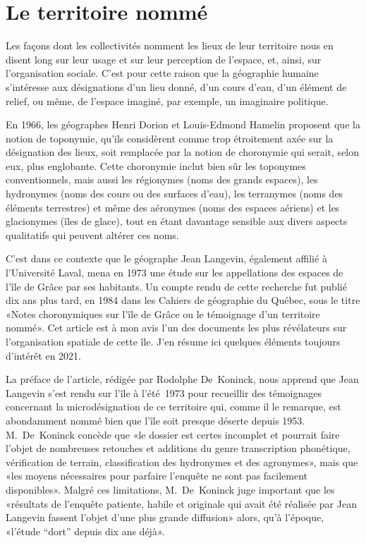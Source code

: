 \documentclass[12pt]{report}
\begin{document}
\section{Le territoire nommé}
Les façons dont les collectivités nomment les lieux de leur territoire nous en disent long sur leur usage et sur leur perception de l’espace, et, ainsi, sur l’organisation sociale. C’est pour cette raison que la géographie humaine s’intéresse aux désignations d’un lieu donné, d’un cours d’eau, d’un élément de relief, ou même, de l’espace imaginé, par exemple, un imaginaire politique.  

En 1966, les géographes Henri Dorion et Louis-Edmond Hamelin proposent que la notion de toponymie, qu’ils considèrent comme trop étroitement axée sur la désignation des lieux, soit remplacée par la notion de choronymie qui serait, selon eux, plus englobante. Cette choronymie inclut bien sûr les toponymes conventionnels, mais aussi les régionymes (noms des grands espaces), les hydronymes (noms des cours ou des surfaces d’eau), les terranymes (noms des éléments terrestres) et même des aéronymes (noms des espaces aériens) et les glacionymes (îles de glace), tout en étant davantage sensible aux divers aspects qualitatifs qui peuvent altérer ces noms.  

C’est dans ce contexte que le géographe Jean Langevin, également affilié à l’Université Laval, mena en 1973 une étude sur les appellations des espaces de l’île de Grâce par ses habitants. Un compte rendu de cette recherche fut publié dix ans plus tard, en 1984 dans les Cahiers de géographie du Québec, sous le titre «Notes choronymiques sur l’île de Grâce ou le témoignage d’un territoire nommé». Cet article est à mon avis l’un des documents les plus révélateurs sur l’organisation spatiale de cette île. J’en résume ici quelques éléments toujours d’intérêt en 2021.  

La préface de l’article, rédigée par Rodolphe De Koninck, nous apprend que Jean Langevin s’est rendu sur l’île à l’été 1973 pour recueillir des témoignages concernant la microdésignation de ce territoire qui, comme il le remarque, est abondamment nommé bien que l’île soit presque déserte depuis 1953. M. De Koninck concède que «le dossier est certes incomplet et pourrait faire l’objet de nombreuses retouches et additions du genre transcription phonétique, vérification de terrain, classification des hydronymes et des agronymes», mais que «les moyens nécessaires pour parfaire l’enquête ne sont pas facilement disponibles». Malgré ces limitations, M. De Koninck juge important que les «résultats de l’enquête patiente, habile et originale qui avait été réalisée par Jean Langevin fassent l’objet d’une plus grande diffusion» alors, qu’à l’époque, «l’étude “dort” depuis dix ans déjà».  
\end{document}
